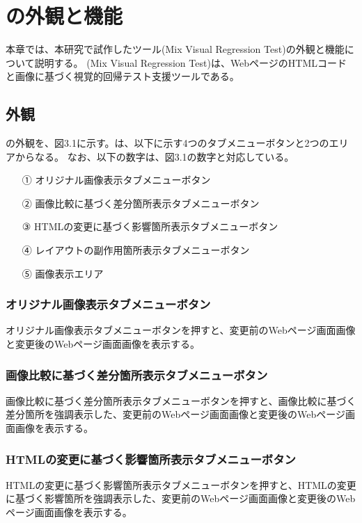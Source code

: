 \chapter{ \toolName の外観と機能}\label{cha:Function}
本章では、本研究で試作したツール\toolName (Mix Visual Regression Test)の外観と機能について説明する。
\toolName (Mix Visual Regression Test)は、WebページのHTMLコードと画像に基づく視覚的回帰テスト支援ツールである。


\section{外観}\label{sec:area_detection}
\toolName の外観を、図3.1に示す。\toolName は、以下に示す4つのタブメニューボタンと2つのエリアからなる。
なお、以下の数字は、図3.1の数字と対応している。
\begin{itemize}
    \item[①] オリジナル画像表示タブメニューボタン
    \item[②] 画像比較に基づく差分箇所表示タブメニューボタン
    \item[③] HTMLの変更に基づく影響箇所表示タブメニューボタン
    \item[④] レイアウトの副作用箇所表示タブメニューボタン
    \item[⑤] 画像表示エリア
\end{itemize}
\par

\subsection{オリジナル画像表示タブメニューボタン}\label{subsec:original_tab}
オリジナル画像表示タブメニューボタンを押すと、変更前のWebページ画面画像と変更後のWebページ画面画像を表示する。


\subsection{画像比較に基づく差分箇所表示タブメニューボタン}\label{subsec:img_tab}
画像比較に基づく差分箇所表示タブメニューボタンを押すと、画像比較に基づく差分箇所を強調表示した、変更前のWebページ画面画像と変更後のWebページ画面画像を表示する。

\subsection{HTMLの変更に基づく影響箇所表示タブメニューボタン}\label{subsec:html_tab}
HTMLの変更に基づく影響箇所表示タブメニューボタンを押すと、HTMLの変更に基づく影響箇所を強調表示した、変更前のWebページ画面画像と変更後のWebページ画面画像を表示する。



